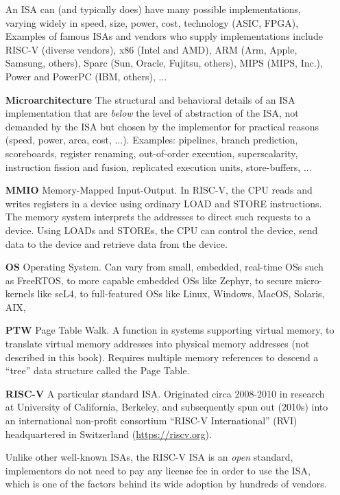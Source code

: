 \begin{itemize}
  An ISA can (and typically does) have many possible implementations,
  varying widely in speed, size, power, cost, technology (ASIC, FPGA),
  {\etc} Examples of famous ISAs and vendors who supply
  implementations include RISC-V (diverse vendors), x86 (Intel and
  AMD), ARM (Arm, Apple, Samsung, others), Sparc (Sun, Oracle,
  Fujitsu, others), MIPS (MIPS, Inc.), Power and PowerPC (IBM,
  others), ...

\item[\bf Microarchitecture] The structural and behavioral details of
  an ISA implementation that are \emph{below} the level of abstraction
  of the ISA, {\ie} not demanded by the ISA but chosen by the
  implementor for practical reasons (speed, power, area, cost, ...).
  Examples: pipelines, branch prediction, scoreboards, register
  renaming, out-of-order execution, superscalarity, instruction
  fission and fusion, replicated execution units, store-buffers, ...

\item[\bf MMIO] Memory-Mapped Input-Output.  In RISC-V, the CPU reads
  and writes registers in a device using ordinary LOAD and STORE
  instructions.  The memory system interprets the addresses to direct
  such requests to a device.  Using LOADs and STOREs, the CPU can
  control the device, send data to the device and retrieve data from
  the device.

\item[\bf OS] Operating System.  Can vary from small, embedded,
  real-time OSs such as FreeRTOS, to more capable embedded OSs like
  Zephyr, to secure micro-kernels like seL4, to full-featured OSs like
  Linux, Windows, MacOS, Solaris, AIX, {\etc}

\item[\bf PTW] Page Table Walk.  A function in systems supporting
  virtual memory, to translate virtual memory addresses into physical
  memory addresses (not described in this book).  Requires multiple
  memory references to descend a ``tree'' data structure called the
  Page Table.

\item[\bf RISC-V] A particular standard ISA.  Originated circa
  2008-2010 in research at University of California, Berkeley, and
  subsequently spun out (2010s) into an international non-profit
  consortium ``RISC-V International'' (RVI) headquartered in
  Switzerland (\url{https://riscv.org}).

  Unlike other well-known ISAs, the RISC-V ISA is an \emph{open}
  standard, {\ie} implementors do not need to pay any license fee in
  order to use the ISA, which is one of the factors behind its wide
  adoption by hundreds of vendors.


\end{itemize}

